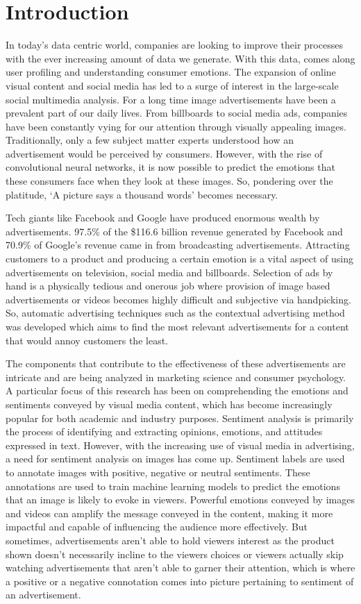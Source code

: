 \documentclass[conference]{IEEEtran}
\begin{document}
\section{Introduction}
In today's data centric world, companies are looking to improve their processes 
 with the ever increasing amount of data we generate. With this data, comes 
 along user profiling and understanding consumer emotions. The 
 expansion of online visual content and social media has led to a surge of 
 interest in the large-scale social multimedia analysis. For a long time image advertisements 
have been a prevalent part of our daily lives. From billboards to social 
media ads, companies have been constantly vying for our attention through visually 
appealing images. Traditionally, only a few subject matter experts understood how 
an advertisement would be perceived by consumers. However, with the rise of 
convolutional neural networks, it is now possible to predict the emotions that 
these consumers face when they look at these images. So, 
pondering over the platitude, `A picture says a thousand words' becomes necessary.

Tech giants like Facebook and Google have produced enormous wealth by 
advertisements. 97.5\% of the \$116.6 billion revenue generated by 
Facebook\cite{b1} and 70.9\% of Google's revenue\cite{b2} came in from 
broadcasting advertisements. Attracting customers to a product and producing a 
certain emotion is a vital aspect of using advertisements on television, social media
 and billboards. Selection of ads by hand is a physically tedious and onerous job 
 where provision of image based advertisements or videos becomes highly difficult 
 and subjective via handpicking. 
So, automatic advertising techniques such as the contextual 
advertising method was developed which aims to find the most relevant advertisements
 for a content that would annoy customers the least.

The components that contribute to the effectiveness of these advertisements are 
intricate and are being analyzed in marketing science and consumer psychology. 
A particular focus of this research has been on comprehending the emotions and 
sentiments conveyed by visual media content, which has become increasingly 
popular for both academic and industry purposes. Sentiment analysis is primarily the 
process of identifying and extracting opinions, emotions, and attitudes expressed 
in text. However, with the increasing use of visual media in advertising, a need 
for sentiment analysis on images has come up. Sentiment labels are used to 
annotate images with positive, negative or neutral sentiments. These annotations 
are used to train machine learning models to predict the emotions that an image is 
likely to evoke in viewers.
Powerful emotions conveyed by images and videos can amplify the message conveyed 
in the content, making it more impactful and capable of influencing the audience 
more effectively. But sometimes, advertisements aren't able to hold viewers 
interest as the product shown doesn't necessarily incline to the viewers choices 
or viewers actually skip watching advertisements that aren't able to garner 
their attention, which is where a positive or a negative connotation comes 
into picture pertaining to sentiment of an advertisement.
\end{document}
